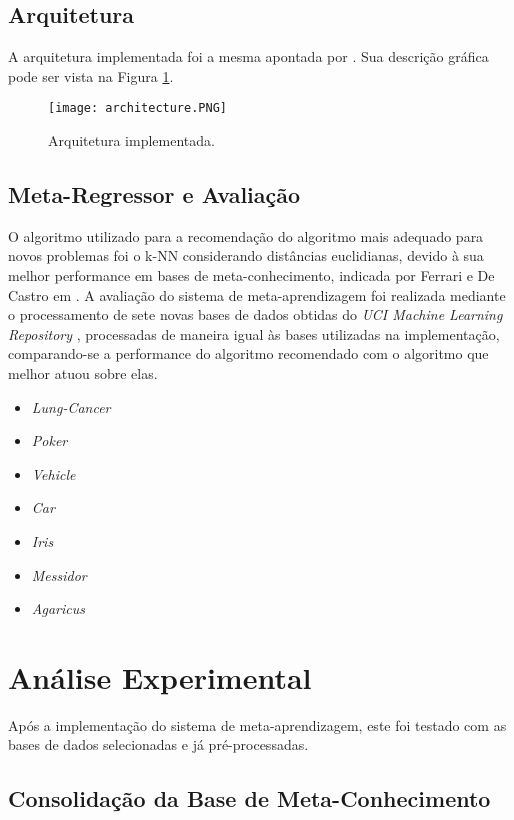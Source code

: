 \documentclass[runningheads]{llncs}
\begin{document}
\subsection{Arquitetura}

A arquitetura implementada foi a mesma apontada por \cite{kalousis}. Sua descrição gráfica pode ser vista na Figura \ref{arch}.

\begin{figure}[ht]
\texttt{[image: architecture.PNG]}
\caption{Arquitetura implementada.} \label{arch}
\end{figure}

\subsection{Meta-Regressor e Avaliação}

O algoritmo utilizado para a recomendação do algoritmo mais adequado para novos problemas foi o k-NN considerando distâncias euclidianas, devido à sua melhor performance em bases de meta-conhecimento, indicada por Ferrari e De Castro em \cite{clustering}. A avaliação do sistema de meta-aprendizagem foi realizada mediante o processamento de sete novas bases de dados obtidas do \emph{UCI Machine Learning Repository} \cite{uci}, processadas de maneira igual às bases utilizadas na implementação, comparando-se a performance do algoritmo recomendado com o algoritmo que melhor atuou sobre elas.

\begin{itemize}
\item \emph{Lung-Cancer}
\item \emph{Poker}
\item \emph{Vehicle}
\item \emph{Car}
\item \emph{Iris}
\item \emph{Messidor}
\item \emph{Agaricus}
\end{itemize}

\section{Análise Experimental}

Após a implementação do sistema de meta-aprendizagem, este foi testado com as bases de dados selecionadas e já pré-processadas. 

\subsection{Consolidação da Base de Meta-Conhecimento}
\end{document}
